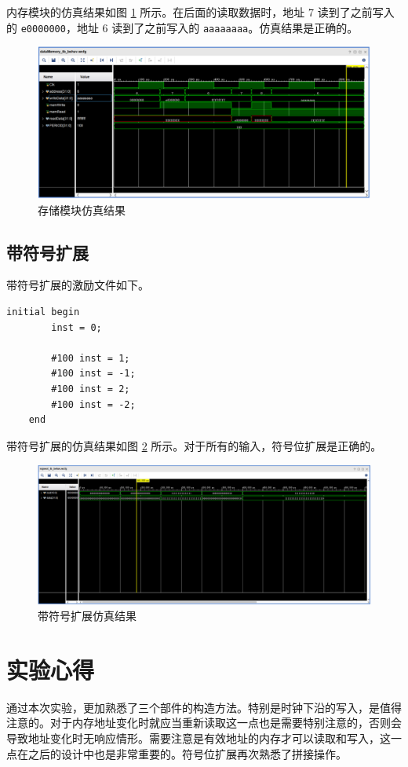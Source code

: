 \documentclass[a4paper,UTF8]{ctexart}
\begin{document}
内存模块的仿真结果如图 \ref{fig:memtb} 所示。在后面的读取数据时，地址 7 读到了之前写入的 \verb"e0000000"，地址 6 读到了之前写入的 \verb"aaaaaaaa"。仿真结果是正确的。
\begin{figure}[h]
    \centering
    \includegraphics[width=\textwidth]{figure2.png}
    \caption{存储模块仿真结果}
    \label{fig:memtb}
\end{figure}

\subsection{带符号扩展}

带符号扩展的激励文件如下。

\begin{lstlisting}[caption=signext\_tb.v]
    initial begin
        inst = 0;
        
        #100 inst = 1;
        #100 inst = -1;
        #100 inst = 2;
        #100 inst = -2;
    end
\end{lstlisting}

带符号扩展的仿真结果如图 \ref{fig:signext} 所示。对于所有的输入，符号位扩展是正确的。
\begin{figure}[h]
    \centering
    \includegraphics[width=\textwidth]{figure3.png}
    \caption{带符号扩展仿真结果}
    \label{fig:signext}
\end{figure}

\section{实验心得}

通过本次实验，更加熟悉了三个部件的构造方法。特别是时钟下沿的写入，是值得注意的。对于内存地址变化时就应当重新读取这一点也是需要特别注意的，否则会导致地址变化时无响应情形。需要注意是有效地址的内存才可以读取和写入，这一点在之后的设计中也是非常重要的。符号位扩展再次熟悉了拼接操作。
\end{document}
